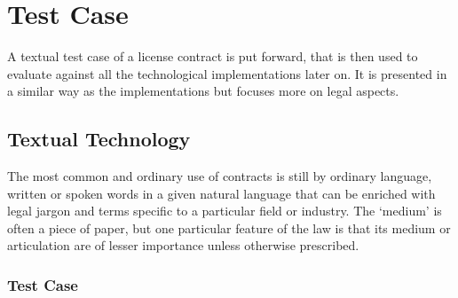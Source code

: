 \documentclass[conference]{IEEEtran}
\begin{document}
\section{Test Case}

A textual test case of a license contract is put forward, that is then used to evaluate against all the technological implementations later on. It is presented in a similar way as the implementations but focuses more on legal aspects.

\subsection{Textual Technology}

The most common and ordinary use of contracts is still by ordinary language, written or spoken words in a given natural language that can be enriched with legal jargon and terms specific to a particular field or industry. The ‘medium’ is often a piece of paper, but one particular feature of the law is that its medium or articulation are of lesser importance unless otherwise prescribed. %
\subsubsection{Test Case}
\end{document}
